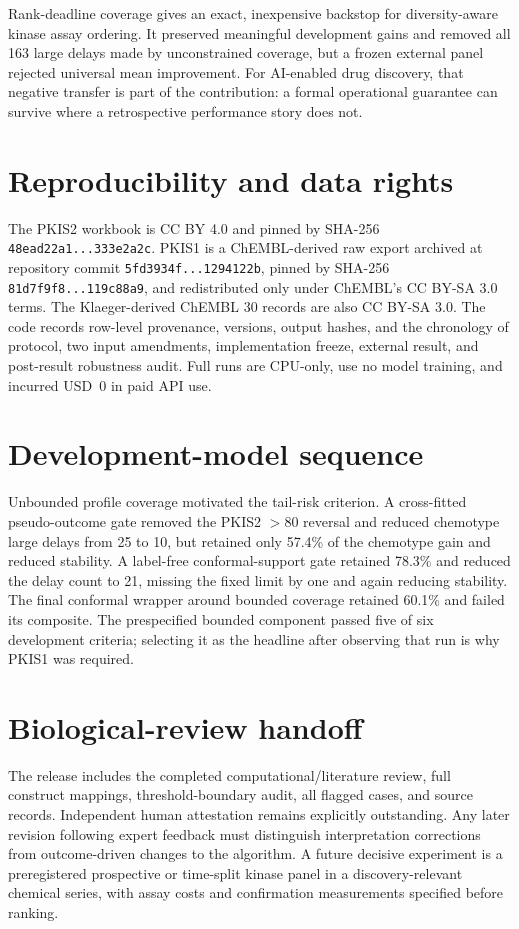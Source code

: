 \documentclass{article}
\begin{document}
Rank-deadline coverage gives an exact, inexpensive backstop for diversity-aware
kinase assay ordering. It preserved meaningful development gains and removed
all 163 large delays made by unconstrained coverage, but a frozen external
panel rejected universal mean improvement. For AI-enabled drug discovery, that
negative transfer is part of the contribution: a formal operational guarantee
can survive where a retrospective performance story does not.




\appendix
\section{Reproducibility and data rights}

The PKIS2 workbook is CC BY 4.0 and pinned by SHA-256
\texttt{48ead22a1...333e2a2c}. PKIS1 is a ChEMBL-derived raw export archived at
repository commit \texttt{5fd3934f...1294122b}, pinned by SHA-256
\texttt{81d7f9f8...119c88a9}, and redistributed only under ChEMBL's CC BY-SA
3.0 terms. The Klaeger-derived ChEMBL 30 records are also CC BY-SA 3.0. The
code records row-level provenance, versions, output hashes, and the chronology
of protocol, two input amendments, implementation freeze, external result, and
post-result robustness audit. Full runs are CPU-only, use no model training,
and incurred USD~0 in paid API use.

\section{Development-model sequence}

Unbounded profile coverage motivated the tail-risk criterion. A cross-fitted
pseudo-outcome gate removed the PKIS2 $>80$ reversal and reduced chemotype
large delays from 25 to 10, but retained only 57.4\% of the chemotype gain and
reduced stability. A label-free conformal-support gate retained 78.3\% and
reduced the delay count to 21, missing the fixed limit by one and again reducing
stability. The final conformal wrapper around bounded coverage retained 60.1\%
and failed its composite. The prespecified bounded component passed five of six
development criteria; selecting it as the headline after observing that run is
why PKIS1 was required.

\section{Biological-review handoff}

The release includes the completed computational/literature review, full
construct mappings, threshold-boundary audit, all flagged cases, and source
records. Independent human attestation remains explicitly outstanding. Any
later revision following expert feedback must distinguish interpretation
corrections from outcome-driven changes to the algorithm. A
future decisive experiment is a preregistered prospective or time-split kinase
panel in a discovery-relevant chemical series, with assay costs and confirmation
measurements specified before ranking.
\end{document}
